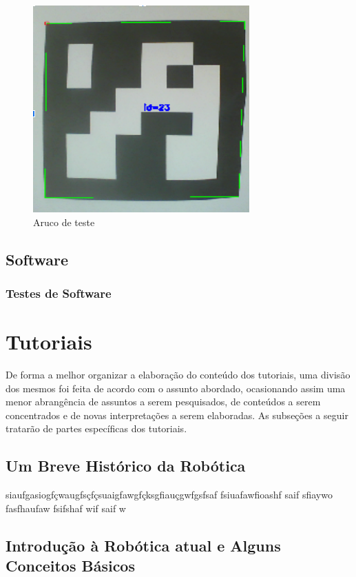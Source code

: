 \begin{figure}[H]
	\centering
	\includegraphics[scale=0.8, angle=0]{Figures/aruco1.png}
	\caption{Aruco de teste}
	\label{fig:aruco1}
\end{figure}

\subsection{Software}

\subsubsection{Testes de Software}

\section{Tutoriais}
De forma a melhor organizar a elaboração do conteúdo dos tutoriais, uma divisão dos mesmos foi feita de acordo com o assunto abordado, ocasionando assim uma menor abrangência de assuntos a serem pesquisados, de conteúdos a serem concentrados e de novas interpretações a serem elaboradas. As subseções a seguir tratarão de partes específicas dos tutoriais.

\subsection{Um Breve Histórico da Robótica}
siaufgasiogfçwaugfsçfçsuaigfawgfçksgfiauçgwfgsfsaf fsiuafawfioashf saif sfiaywo fasfhaufaw fsifshaf wif saif w

\subsection{Introdução à Robótica atual e Alguns Conceitos Básicos}

